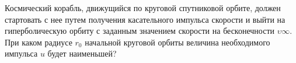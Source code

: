  Космический корабль, движущийся по круговой спутниковой орбите, должен
 стартовать с нее путем получения касательного импульса скорости и выйти
 на гиперболическую орбиту с заданным значением скорости на 
 бесконечности $\upsilon \infty$. При каком радиусе $r_0$ начальной круговой
 орбиты величина необходимого импульса $u$ будет наименьшей?
